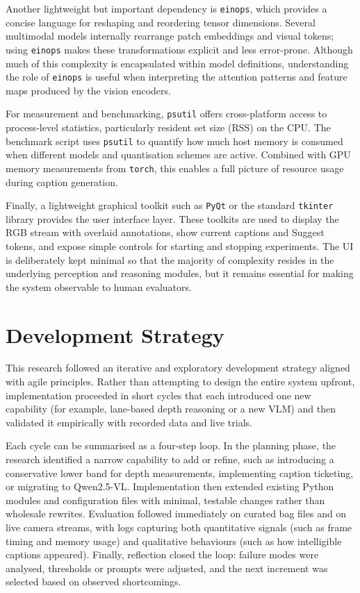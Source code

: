 \documentclass[11pt,a4paper]{article}
\newcommand{\code}[1]{\texttt{#1}}
\begin{document}
Another lightweight but important dependency is \code{einops}, which provides a concise language for reshaping and reordering tensor dimensions. Several multimodal models internally rearrange patch embeddings and visual tokens; using \code{einops} makes these transformations explicit and less error-prone. Although much of this complexity is encapsulated within model definitions, understanding the role of \code{einops} is useful when interpreting the attention patterns and feature maps produced by the vision encoders.

For measurement and benchmarking, \code{psutil} offers cross-platform access to process-level statistics, particularly resident set size (RSS) on the CPU. The benchmark script uses \code{psutil} to quantify how much host memory is consumed when different models and quantisation schemes are active. Combined with GPU memory measurements from \code{torch}, this enables a full picture of resource usage during caption generation.

Finally, a lightweight graphical toolkit such as \code{PyQt} or the standard \code{tkinter} library provides the user interface layer. These toolkits are used to display the RGB stream with overlaid annotations, show current captions and Suggest tokens, and expose simple controls for starting and stopping experiments. The UI is deliberately kept minimal so that the majority of complexity resides in the underlying perception and reasoning modules, but it remains essential for making the system observable to human evaluators.

\section{Development Strategy}

This research followed an iterative and exploratory development strategy aligned with agile principles. Rather than attempting to design the entire system upfront, implementation proceeded in short cycles that each introduced one new capability (for example, lane-based depth reasoning or a new VLM) and then validated it empirically with recorded data and live trials.

Each cycle can be summarised as a four-step loop. In the planning phase, the research identified a narrow capability to add or refine, such as introducing a conservative lower band for depth measurements, implementing caption ticketing, or migrating to Qwen2.5-VL. Implementation then extended existing Python modules and configuration files with minimal, testable changes rather than wholesale rewrites. Evaluation followed immediately on curated bag files and on live camera streams, with logs capturing both quantitative signals (such as frame timing and memory usage) and qualitative behaviours (such as how intelligible captions appeared). Finally, reflection closed the loop: failure modes were analysed, thresholds or prompts were adjusted, and the next increment was selected based on observed shortcomings.
\end{document}
